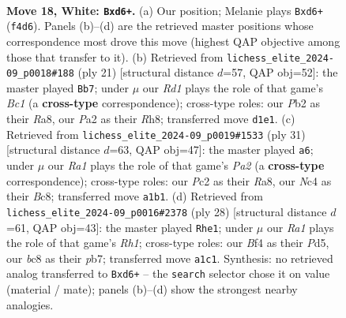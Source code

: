 \documentclass[11pt]{article}
\begin{document}
\clearpage

\begin{figure}[p]\centering
\begin{subfigure}{0.46\textwidth}\centering
\resizebox{\linewidth}{!}{%
\newchessgame
\chessboard[
  setfen={r1b2bnr/p3k1pp/2pp4/5p2/2N2B2/3B1P2/PPP3PP/R2R2K1 w - - 10 18},
  showmover=false,
  pgfstyle=straightmove, color=movearrow, markmove={f4-d6}
]}
\caption{}
\end{subfigure}\hfill
\begin{subfigure}{0.46\textwidth}\centering
\resizebox{\linewidth}{!}{%
\newchessgame
\chessboard[
  setfen={r1b1k2r/p1p2ppp/1p2p3/2b5/1n2P2P/6P1/PPP1KP2/R1B1NB1R b kq - 2 11},
  showmover=false,
  pgfstyle=straightmove, color=movearrow, markmove={c8-b7}
]}
\caption{}
\end{subfigure}
\\[4pt]
\begin{subfigure}{0.46\textwidth}\centering
\resizebox{\linewidth}{!}{%
\newchessgame
\chessboard[
  setfen={r1b1kb1r/pp3ppp/5n2/2p5/4P3/2P1BP1N/P1P4P/2KR1B1R b kq - 1 16},
  showmover=false,
  pgfstyle=straightmove, color=movearrow, markmove={a7-a6}
]}
\caption{}
\end{subfigure}\hfill
\begin{subfigure}{0.46\textwidth}\centering
\resizebox{\linewidth}{!}{%
\newchessgame
\chessboard[
  setfen={1nr4r/1pp1kppp/p2b4/3Pp3/2B5/5N2/PPP2PPP/2KR3R w - - 0 15},
  showmover=false,
  pgfstyle=straightmove, color=movearrow, markmove={h1-e1}
]}
\caption{}
\end{subfigure}
\caption{\textbf{Move 18, White: \texttt{Bxd6+}.} (a) Our position; Melanie plays \texttt{Bxd6+} (\texttt{f4d6}). Panels (b)--(d) are the retrieved master positions whose correspondence most drove this move (highest QAP objective among those that transfer to it). (b) Retrieved from \texttt{lichess\_elite\_2024-09\_p0018\#188} (ply 21) [structural distance $d$=57, QAP obj=52]: the master played \texttt{Bb7}; under $\mu$ our \emph{Rd1} plays the role of that game's \emph{Bc1} (a \textbf{cross-type} correspondence); cross-type roles: our \emph{P}b2 as their \emph{R}a8, our \emph{P}a2 as their \emph{R}h8; transferred move \texttt{d1e1}. (c) Retrieved from \texttt{lichess\_elite\_2024-09\_p0019\#1533} (ply 31) [structural distance $d$=63, QAP obj=47]: the master played \texttt{a6}; under $\mu$ our \emph{Ra1} plays the role of that game's \emph{Pa2} (a \textbf{cross-type} correspondence); cross-type roles: our \emph{P}c2 as their \emph{R}a8, our \emph{N}c4 as their \emph{B}c8; transferred move \texttt{a1b1}. (d) Retrieved from \texttt{lichess\_elite\_2024-09\_p0016\#2378} (ply 28) [structural distance $d$=61, QAP obj=43]: the master played \texttt{Rhe1}; under $\mu$ our \emph{Ra1} plays the role of that game's \emph{Rh1}; cross-type roles: our \emph{B}f4 as their \emph{P}d5, our \emph{b}c8 as their \emph{p}b7; transferred move \texttt{a1c1}. Synthesis: no retrieved analog transferred to \texttt{Bxd6+} -- the \texttt{search} selector chose it on value (material / mate); panels (b)--(d) show the strongest nearby analogies.}
\label{fig:thought-m34}
\end{figure}
\end{document}
